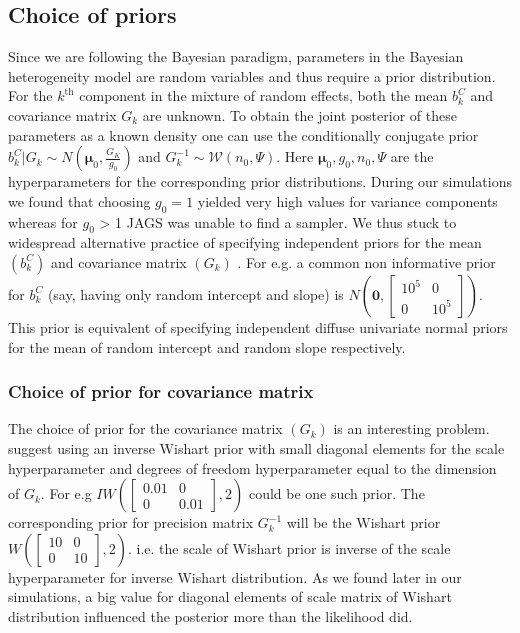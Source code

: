 \subsection{Choice of priors}
\label{subsec : choice_priors}
Since we are following the Bayesian paradigm, parameters in the Bayesian heterogeneity model are random variables and thus require a prior distribution. For the $k^\text{th}$ component in the mixture of random effects, both the mean $b_k^C$ and covariance matrix $G_k$ are unknown. To obtain the joint posterior of these parameters as a known density one can use the conditionally conjugate prior $b_k^C | G_k \sim N(\boldsymbol{\mu}_0, \frac {G_K} {g_0})$ and $G_k^{-1} \sim \mathcal{W} (n_0, \Psi)$. Here $\boldsymbol{\mu}_0, g_0, n_0, \Psi$ are the hyperparameters for the corresponding prior distributions. During our simulations we found that choosing $g_0=1$ yielded very high values for variance components whereas for $g_0$ > 1 JAGS was unable to find a sampler. We thus stuck to widespread alternative practice of specifying independent priors for the mean $(b_k^C)$ and covariance matrix $(G_k)$ \citep[chap. 17]{gelman_data_2006}. For e.g. a common non informative prior for $b_k^C$ (say, having only random intercept and slope) is $N(\boldsymbol{0}, \begin{bmatrix}10^5 & 0 \\ 0 & 10^5\end{bmatrix})$. This prior is equivalent of specifying independent diffuse univariate normal priors for the mean of random intercept and random slope respectively.

\subsubsection{Choice of prior for covariance matrix}
The choice of prior for the covariance matrix $(G_k)$ is an interesting problem. \citet[pg. 260]{lesaffre_bayesian_2012} suggest using an inverse Wishart prior with small diagonal elements for the scale hyperparameter and degrees of freedom hyperparameter equal to the dimension of $G_k$. For e.g $IW(\begin{bmatrix}0.01 & 0 \\ 0 & 0.01\end{bmatrix}, 2)$ could be one such prior. The corresponding prior for precision matrix $G_k^{-1}$ will be the Wishart prior $W(\begin{bmatrix}10 & 0 \\ 0 & 10\end{bmatrix}, 2)$. i.e. the scale of Wishart prior is inverse of the scale hyperparameter for inverse Wishart distribution. As we found later in our simulations, a big value for diagonal elements of scale matrix of Wishart distribution influenced the posterior more than the likelihood did.\\

